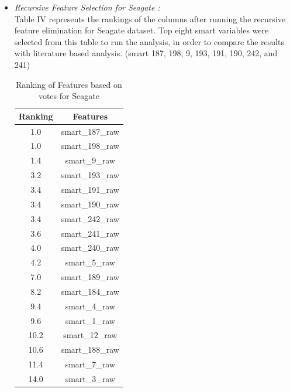 \documentclass[conference]{IEEEtran}
\begin{document}
\begin{itemize}
    \item \textit{Recursive Feature Selection for Seagate :}\\
Table IV represents the rankings of the columns after running the recursive feature elimination for Seagate dataset. Top eight smart variables were selected from this table to run the analysis, in order to compare the results with literature based analysis. (smart 187, 198, 9, 193, 191, 190, 242, and 241) \\
    

 \begin{table}[hbt]
    \begin{center}
    \caption{Ranking of Features based on votes for Seagate}
    \begin{tabular}{|c||c||}
    \hline
    \textbf{Ranking} & \textbf{Features}\\ \hline
    1.0     & smart\_187\_raw   \\ \hline
    1.0     & smart\_198\_raw \\ \hline
    1.4     & smart\_9\_raw \\ \hline
    3.2     & smart\_193\_raw  \\ \hline
    3.4     & smart\_191\_raw   \\ \hline
    3.4     & smart\_190\_raw \\ \hline
    3.4     & smart\_242\_raw \\ \hline
    3.6     & smart\_241\_raw \\ \hline
    4.0     & smart\_240\_raw \\ \hline
    4.2     & smart\_5\_raw   \\ \hline
    7.0     & smart\_189\_raw \\ \hline
    8.2     & smart\_184\_raw   \\ \hline
    9.4     & smart\_4\_raw   \\ \hline
    9.6     & smart\_1\_raw   \\ \hline
    10.2     & smart\_12\_raw \\ \hline
    10.6     & smart\_188\_raw   \\ \hline
    11.4     & smart\_7\_raw   \\ \hline
    14.0     & smart\_3\_raw   \\ \hline
    \end{tabular}
    \end{center}
    \end{table}    
    

\end{itemize}
\end{document}
